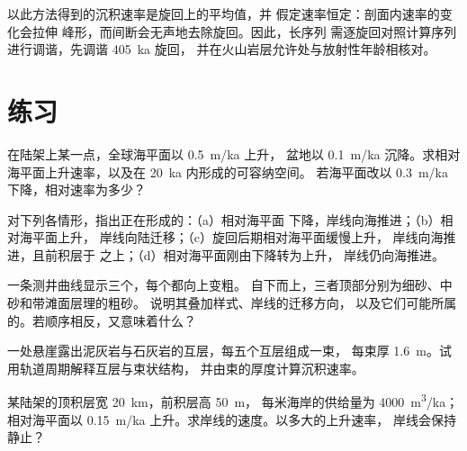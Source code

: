 以此方法得到的沉积速率是旋回上的平均值，并
假定速率恒定：剖面内速率的变化会拉伸
峰形，而间断会无声地去除旋回。因此，长序列
需逐旋回对照计算序列进行调谐，先调谐 \qty{405}{ka} 旋回，
并在火山岩层允许处与放射性年龄相核对。

\section{练习}

\begin{exercise}[$\star$]\label{exo:b3:sequence-stratigraphy:1}
在陆架上某一点，全球海平面以 \qty{0.5}{m/ka} 上升，
盆地以 \qty{0.1}{m/ka} 沉降。求相对
海平面上升速率，以及在 \qty{20}{ka} 内形成的可容纳空间。
若海平面改以 \qty{0.3}{m/ka} 下降，相对速率为多少？
\end{exercise}

\begin{exercise}[$\star$]\label{exo:b3:sequence-stratigraphy:2}
对下列各情形，指出正在形成的：（a）相对海平面
下降，岸线向海推进；（b）相对海平面上升，
岸线向陆迁移；（c）旋回后期相对海平面缓慢上升，
岸线向海推进，且前积层于
之上；（d）相对海平面刚由下降转为上升，
岸线仍向海推进。
\end{exercise}

\begin{exercise}[$\star$]\label{exo:b3:sequence-stratigraphy:3}
一条测井曲线显示三个，每个都向上变粗。
自下而上，三者顶部分别为细砂、中砂和带滩面层理的粗砂。
说明其叠加样式、岸线的迁移方向，
以及它们可能所属的。若顺序相反，又意味着什么？
\end{exercise}

\begin{exercise}[$\star$]\label{exo:b3:sequence-stratigraphy:4}
一处悬崖露出泥灰岩与石灰岩的互层，每五个互层组成一束，
每束厚 \qty{1.6}{m}。试用轨道周期解释互层与束状结构，
并由束的厚度计算沉积速率。
\end{exercise}

\begin{exercise}[$\star\star$]\label{exo:b3:sequence-stratigraphy:5}
某陆架的顶积层宽 \qty{20}{km}，前积层高 \qty{50}{m}，
每米海岸的供给量为 \qty{4000}{m^3/ka}；相对海平面以
\qty{0.15}{m/ka} 上升。求岸线的速度。以多大的上升速率，
岸线会保持静止？
\end{exercise}

